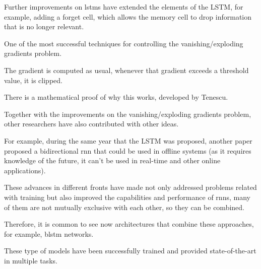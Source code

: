 Further improvements on \glspl{lstm} have extended the elements
of the LSTM, for example, adding a forget cell, which
allows the memory cell to drop information that is no
longer relevant.

 One of the most successful techniques for
controlling the vanishing/exploding gradients problem.

The gradient is computed as usual, whenever that gradient
exceeds a threshold value, it is clipped.

There is a mathematical proof of why this works, developed
by Tenescu.

 Together with the improvements on the
vanishing/exploding gradients problem, other researchers
have also contributed with other ideas.

For example, during the same year that the LSTM was
proposed, another paper proposed a bidirectional \gls{rnn} that
could be used in offline systems (as it requires knowledge
of the future, it can’t be used in real-time and other
online applications).

These advances in different fronts have made not only
addressed problems related with training but also improved
the capabilities and performance of \glspl{rnn}, many of them are
not mutually exclusive with each other, so they can be
combined.

Therefore, it is common to see now architectures that
combine these approaches, for example, \gls{blstm} networks.

These type of models have been successfully trained and
provided state-of-the-art in multiple tasks.
